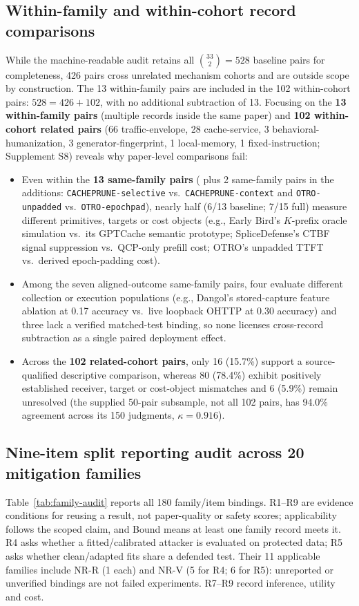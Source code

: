 \subsection{Within-family and within-cohort record comparisons}
While the machine-readable audit retains all $\binom{33}{2}=528$ baseline pairs for completeness, 426 pairs cross unrelated mechanism cohorts and are outside scope by construction. The 13 within-family pairs are included in the 102 within-cohort pairs: $528=426+102$, with no additional subtraction of 13. Focusing on the \textbf{13 within-family pairs} (multiple records inside the same paper) and \textbf{102 within-cohort related pairs} (66 traffic-envelope, 28 cache-service, 3 behavioral-humanization, 3 generator-fingerprint, 1 local-memory, 1 fixed-instruction; Supplement S8) reveals why paper-level comparisons fail:
\begin{itemize}
\item Even within the \textbf{13 same-family pairs} ( plus 2 same-family pairs in the additions: \texttt{CACHEPRUNE-selective} vs.\ \texttt{CACHEPRUNE-context} and \texttt{OTRO-unpadded} vs.\ \texttt{OTRO-epochpad}), nearly half (6/13 baseline; 7/15 full) measure different primitives, targets or cost objects (e.g., Early Bird's $K$-prefix oracle simulation vs.\ its GPTCache semantic prototype; SpliceDefense's CTBF signal suppression vs.\ QCP-only prefill cost; OTRO's unpadded TTFT vs.\ derived epoch-padding cost).
\item Among the seven aligned-outcome same-family pairs, four evaluate different collection or execution populations (e.g., Dangol's stored-capture feature ablation at 0.17 accuracy vs.\ live loopback OHTTP at 0.30 accuracy) and three lack a verified matched-test binding, so none licenses cross-record subtraction as a single paired deployment effect.
\item Across the \textbf{102 related-cohort pairs}, only 16 (15.7\%) support a source-qualified descriptive comparison, whereas 80 (78.4\%) exhibit positively established receiver, target or cost-object mismatches and 6 (5.9\%) remain unresolved (the supplied 50-pair subsample, not all 102 pairs, has 94.0\% agreement across its 150 judgments, $\kappa=0.916$).
\end{itemize}

\subsection{Nine-item split reporting audit across 20 mitigation families}
Table~\ref{tab:family-audit} reports all 180 family/item bindings. R1--R9 are evidence conditions for reusing a result, not paper-quality or safety scores; applicability follows the scoped claim, and Bound means at least one family record meets it. R4 asks whether a fitted/calibrated attacker is evaluated on protected data; R5 asks whether clean/adapted fits share a defended test. Their 11 applicable families include NR-R (1 each) and NR-V (5 for R4; 6 for R5): unreported or unverified bindings are not failed experiments. R7--R9 record inference, utility and cost.



